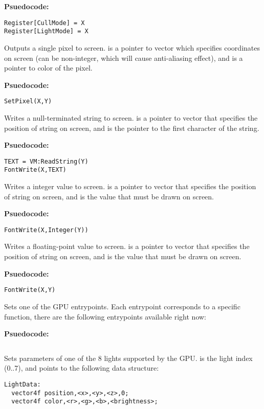 \textbf{Psuedocode:}
\begin{verbatim}
Register[CullMode] = X
Register[LightMode] = X
\end{verbatim}


Outputs a single pixel to screen.  is a pointer to vector which specifies coordinates on screen (can be non-integer, which will cause anti-aliasing effect), and  is a pointer to color of the pixel.

\textbf{Psuedocode:}
\begin{verbatim}
SetPixel(X,Y)
\end{verbatim}


Writes a null-terminated string to screen.  is a pointer to vector that specifies the position of string on screen, and  is the pointer to the first character of the string.

\textbf{Psuedocode:}
\begin{verbatim}
TEXT = VM:ReadString(Y)
FontWrite(X,TEXT)
\end{verbatim}


Writes a integer value to screen.  is a pointer to vector that specifies the position of string on screen, and  is the value that must be drawn on screen.

\textbf{Psuedocode:}
\begin{verbatim}
FontWrite(X,Integer(Y))
\end{verbatim}


Writes a floating-point value to screen.  is a pointer to vector that specifies the position of string on screen, and  is the value that must be drawn on screen.

\textbf{Psuedocode:}
\begin{verbatim}
FontWrite(X,Y)
\end{verbatim}


Sets one of the GPU entrypoints. Each entrypoint corresponds to a specific function, there are the following entrypoints available right now:

\textbf{Psuedocode:}
\begin{verbatim}
\end{verbatim}


Sets parameters of one of the 8 lights supported by the GPU.  is the light index (0..7), and  points to the following data structure:
\begin{verbatim}
LightData:
  vector4f position,<x>,<y>,<z>,0;
  vector4f color,<r>,<g>,<b>,<brightness>;
\end{verbatim}

